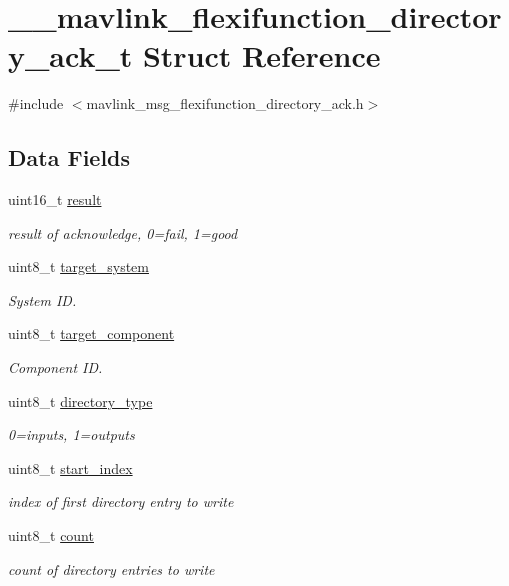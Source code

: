 \hypertarget{struct____mavlink__flexifunction__directory__ack__t}{\section{\+\_\+\+\_\+mavlink\+\_\+flexifunction\+\_\+directory\+\_\+ack\+\_\+t Struct Reference}
\label{struct____mavlink__flexifunction__directory__ack__t}
}


{\ttfamily \#include $<$mavlink\+\_\+msg\+\_\+flexifunction\+\_\+directory\+\_\+ack.\+h$>$}

\subsection*{Data Fields}
\begin{DoxyCompactItemize}
\item 
uint16\+\_\+t \hyperlink{struct____mavlink__flexifunction__directory__ack__t_af1b9cd97b26a4c0ab92107154784c144}{result}
\begin{DoxyCompactList}\small\item\em result of acknowledge, 0=fail, 1=good \end{DoxyCompactList}\item 
uint8\+\_\+t \hyperlink{struct____mavlink__flexifunction__directory__ack__t_a4df59b69b46052099281585477e45ea7}{target\+\_\+system}
\begin{DoxyCompactList}\small\item\em System I\+D. \end{DoxyCompactList}\item 
uint8\+\_\+t \hyperlink{struct____mavlink__flexifunction__directory__ack__t_a6f466fe62c5f2e875f66f11f71c454b9}{target\+\_\+component}
\begin{DoxyCompactList}\small\item\em Component I\+D. \end{DoxyCompactList}\item 
uint8\+\_\+t \hyperlink{struct____mavlink__flexifunction__directory__ack__t_a97f590a5abd2f1430920632f74b1c39e}{directory\+\_\+type}
\begin{DoxyCompactList}\small\item\em 0=inputs, 1=outputs \end{DoxyCompactList}\item 
uint8\+\_\+t \hyperlink{struct____mavlink__flexifunction__directory__ack__t_a682549c58d3719c977ba69b2789ae10c}{start\+\_\+index}
\begin{DoxyCompactList}\small\item\em index of first directory entry to write \end{DoxyCompactList}\item 
uint8\+\_\+t \hyperlink{struct____mavlink__flexifunction__directory__ack__t_a684587cb292b7ed5f93e2935c1c2db57}{count}
\begin{DoxyCompactList}\small\item\em count of directory entries to write \end{DoxyCompactList}\end{DoxyCompactItemize}



